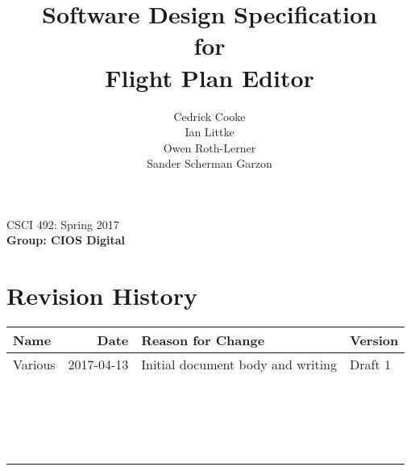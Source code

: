 \documentclass[12pt, letterpaper]{article}
\title{Software Design Specification\\for\\Flight Plan Editor}
\date{}
\author{
Cedrick Cooke\\
Ian Littke\\
Owen Roth-Lerner\\
Sander Scherman Garzon
}
\makeatletter
\renewcommand{\maketitle}{\bgroup\setlength{\parindent}{0pt}
\thispagestyle{empty}
\null
  \begin{flushleft}
  \vspace{15mm}
  \vskip2mm
  \Huge{\textbf{\@title}}
  \vspace{8cm}

CSCI 492: Spring 2017\\
  \textbf{Group: CIOS Digital}\\

  \@author
  \end{flushleft}\egroup
}
\makeatother
\begin{document}
\maketitle

\newpage
\section*{Revision History}
\begin{tabularx}{\textwidth}{|l|r|X|l|}
\hline
\textbf{Name} & \textbf{Date} & \textbf{Reason for Change} & \textbf{Version} \\ \hline
Various & 2017-04-13 & Initial document body and writing & Draft 1 \\ \hline
        &            &                                   &         \\ \hline
        &            &                                   &         \\ \hline
        &            &                                   &         \\ \hline
        &            &                                   &         \\ \hline
        &            &                                   &         \\ \hline
        &            &                                   &         \\ \hline
        &            &                                   &         \\ \hline
        &            &                                   &         \\ \hline
        &            &                                   &         \\ \hline
        &            &                                   &         \\ \hline
        &            &                                   &         \\ \hline
        &            &                                   &         \\ \hline
        &            &                                   &         \\ \hline
        &            &                                   &         \\ \hline
        &            &                                   &         \\ \hline
        &            &                                   &         \\ \hline
        &            &                                   &         \\ \hline
        &            &                                   &         \\ \hline
\end{tabularx}
\newpage
\tableofcontents
\end{document}
